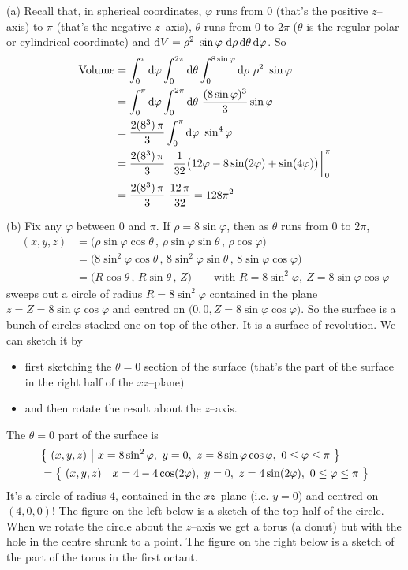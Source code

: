 \begin{solution}
(a)
Recall that, in spherical coordinates, $\varphi$ runs from $0$ (that's the
positive $z$--axis) to $\pi$ (that's the negative $z$--axis),
$\theta$ runs from $0$ to $2\pi$ ($\theta$ is the regular polar 
or cylindrical coordinate)
and 
 $\dee{V} = \rho^2\ \sin\varphi\ \dee{\rho}\,\dee{\theta}\,\dee{\varphi}$.
So
\begin{align*}
\text{Volume} & = \int_0^\pi \dee{\varphi}\int_0^{2\pi}\dee{\theta}
                      \int_0^{8\sin\varphi}\dee{\rho}\ \rho^2\ \sin\varphi \\
& = \int_0^\pi \dee{\varphi}\int_0^{2\pi}\dee{\theta}\ 
                      \frac{(8\sin\varphi)^3}{3} \sin\varphi \\
& = \frac{2(8^3)\,\pi}{3} \int_0^\pi \dee{\varphi}\ 
                       \sin^4\varphi \\
&= \frac{2(8^3)\,\pi}{3} \left[\frac{1}{32}\big(12\varphi -8\sin(2\varphi)
+\sin(4\varphi)\big)\right]_0^\pi \\
&=\frac{2(8^3)\,\pi}{3}\ \frac{12\,\pi}{32}
=128\pi^2
\end{align*}

(b) Fix any $\varphi$ between $0$ and $\pi$. If $\rho=8\sin\varphi$,
then as $\theta$ runs from $0$ to $2\pi$,
\begin{align*}
(x,y,z) &= \big(\rho\sin\varphi\cos\theta\,,\,\rho\sin\varphi\sin\theta\,,\,
               \rho\cos\varphi\big) \\
        &= \big(8\sin^2\varphi\cos\theta\,,\,8\sin^2\varphi\sin\theta\,,\,
               8\sin\varphi\cos\varphi\big) \\
        &= \big(R\cos\theta\,,\,R\sin\theta\,,\,Z\big)\qquad
        \text{with }R=8\sin^2\varphi,\ Z= 8\sin\varphi\cos\varphi
\end{align*}
sweeps out a circle of radius $R=8\sin^2\varphi$ contained in the plane 
$z=Z=8\sin\varphi\cos\varphi$ and centred on
$\big(0,0,Z=8\sin\varphi\cos\varphi\big)$. So the surface is
a bunch of circles stacked one on top of the other. It is a surface of
revolution. We can sketch it by 
\begin{itemize}
\item 
first sketching the $\theta=0$ section of the surface (that's the part of
the surface in the right half of the $xz$--plane)
\item
and then rotate the result about the $z$--axis.
\end{itemize}
The $\theta=0$ part of the surface is
\begin{align*}
&\Set{(x,y,z)}{x=8\sin^2\varphi,\ y=0,\ z=8\sin\varphi\cos\varphi,\ 
                     0\le\varphi\le \pi} \\
&=\Set{(x,y,z)}{x=4-4\cos(2\varphi),\ y=0,\ z=4\sin(2\varphi),\ 
                     0\le\varphi\le \pi}
\end{align*}
It's a circle of radius $4$, contained in the $xz$--plane (i.e. $y=0$)
and centred on $(4,0,0)$! The figure on the left below is a sketch of the
top half of the circle. When we rotate the circle about the $z$--axis
we get a torus (a donut) but with the hole in the centre shrunk to a point.
The figure on the right below is a sketch of the part of the torus in the
first octant.


\end{solution}
